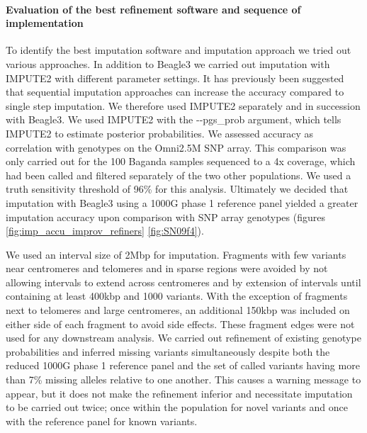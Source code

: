 \paragraph{Evaluation of the best refinement software and sequence of implementation}
To identify the best imputation software and imputation approach we tried out various approaches. In addition to Beagle3 we carried out imputation with IMPUTE2\cite{10.1371/journal.pgen.1000529} with different parameter settings. It has previously been suggested that sequential imputation approaches can increase the accuracy compared to single step imputation.\cite{Pasaniuc2012}
We therefore used IMPUTE2 separately and in succession with Beagle3. We used IMPUTE2 with the -{}-pgs\_prob argument, which tells IMPUTE2 to estimate posterior probabilities. We assessed accuracy as correlation with genotypes on the Omni2.5M SNP array. This comparison was only carried out for the 100 Baganda samples sequenced to a 4x coverage, which had been called and filtered separately of the two other populations. We used a truth sensitivity threshold of 96\% for this analysis.
Ultimately we decided that imputation with Beagle3\cite{Browning20071084} using a \gls{1000G} phase 1 reference panel yielded a greater imputation accuracy upon comparison with SNP array genotypes (figures \ref{fig:imp_accu_improv_refiners} \ref{fig:SN09f4}).



We used an interval size of 2\gls{Mbp} for imputation. Fragments with few variants near centromeres and telomeres and in sparse regions were avoided by not allowing intervals to extend across centromeres and by extension of intervals until containing at least 400\gls{kbp} and 1000 variants. With the exception of fragments next to telomeres and large centromeres, an additional 150\gls{kbp} was included on either side of each fragment to avoid side effects. These fragment edges were not used for any downstream analysis.
We carried out refinement of existing genotype probabilities and inferred missing variants simultaneously despite both the reduced \gls{1000G} phase 1 reference panel and the set of called variants having more than 7\% missing alleles relative to one another. This causes a warning message to appear, but it does not make the refinement inferior and necessitate imputation to be carried out twice; once within the population for novel variants and once with the reference panel for known variants.

